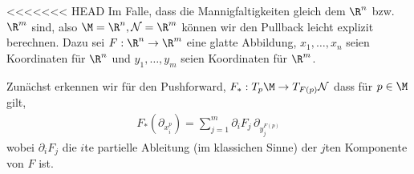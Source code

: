 \documentclass[letterpaper,10pt,english]{jupyterBook}
\begin{document}
<<<<<<< HEAD
\sphinxAtStartPar
Im Falle, dass die Mannigfaltigkeiten gleich dem \(\R^n\) bzw. \(\R^m\) sind, also \(\M=\R^n, \mathcal{N}=\R^m\) können wir den Pullback leicht explizit berechnen. Dazu sei \(F:\R^n\to\R^m\) eine glatte Abbildung, \(x_1,\ldots,x_n\) seien Koordinaten für \(\R^n\) und \(y_1,\ldots,y_m\) seien Koordinaten für \(\R^m\).

\sphinxAtStartPar
Zunächst erkennen wir für den Pushforward, \(F_\ast:T_p\M\to T_{F(p)}\mathcal{N}\) dass für \(p\in\M\) gilt,
\begin{equation*}
\begin{split}F_\ast(\partial_{x_i^p}) = \sum_{j=1}^m \partial_i F_j\, \partial_{y_j^{F(p)}}\end{split}
\end{equation*}
\sphinxAtStartPar
wobei \(\partial_i F_j\) die \(i\)\sphinxhyphen{}te partielle Ableitung (im klassichen Sinne) der \(j\)\sphinxhyphen{}ten Komponente von \(F\) ist.
\end{document}
